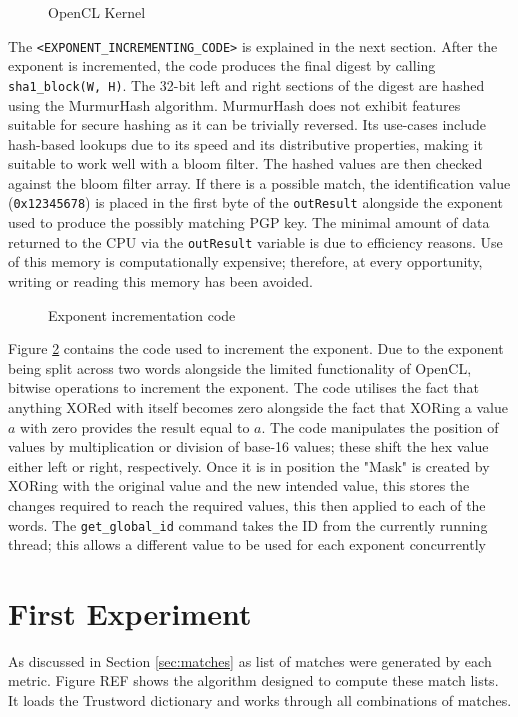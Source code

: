 \begin{figure}[!h]
  \centering
  
  \caption{OpenCL Kernel}
  \label{fig:opencl}
\end{figure}

The \verb|<EXPONENT_INCREMENTING_CODE>| is explained in the next section. After the exponent is incremented, the code produces the final digest by calling \verb|sha1_block(W, H)|. The 32-bit left and right sections of the digest are hashed using the MurmurHash algorithm. MurmurHash does not exhibit features suitable for secure hashing as it can be trivially reversed. Its use-cases include hash-based lookups due to its speed and its distributive properties, making it suitable to work well with a bloom filter. The hashed values are then checked against the bloom filter array. If there is a possible match, the identification value (\verb|0x12345678|) is placed in the first byte of the \verb|outResult| alongside the exponent used to produce the possibly matching PGP key. The minimal amount of data returned to the CPU via the \verb|outResult| variable is due to efficiency reasons. Use of this memory is computationally expensive; therefore, at every opportunity, writing or reading this memory has been avoided.

\begin{figure}[!h]
  \centering
  
  \caption{Exponent incrementation code}
  \label{fig:increment}
\end{figure}

Figure \ref{fig:increment} contains the code used to increment the exponent. Due to the exponent being split across two words alongside the limited functionality of OpenCL, bitwise operations to increment the exponent. The code utilises the fact that anything XORed with itself becomes zero alongside the fact that XORing a value $a$ with zero provides the result equal to $a$. The code manipulates the position of values by multiplication or division  of base-16 values; these shift the hex value either left or right, respectively. Once it is in position the "Mask" is created by XORing with the original value and the new intended value, this stores the changes required to reach the required values, this then applied to each of the words.
The \verb|get_global_id| command takes the ID from the currently running thread; this allows a different value to be used for each exponent concurrently

\newpage

\section{First Experiment}
As discussed in Section \ref{sec:matches} as list of matches were generated by each metric. Figure REF shows the algorithm designed to compute these match lists. It loads the Trustword dictionary and works through all combinations of matches.

